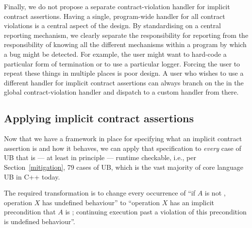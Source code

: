Finally, we do not propose a separate contract-violation handler for implicit contract assertions. Having a single, program-wide handler for all contract violations is a central aspect of the \cite{P2900R14} design. By standardising on a central reporting mechanism, we clearly separate the responsibility for reporting from the responsibility of knowing all the different mechanisms within a program by which a bug might be detected. For example, the user might want to hard-code a particular form of termination or to use a particular logger. Forcing the user to repeat these things in multiple places is poor design. A user who wishes to use a different handler for implicit contract assertions can always branch on the  in the global contract-violation handler and dispatch to a custom handler from there.

\subsection{Applying implicit contract assertions}
\label{applyicas}

Now that we have a framework in place for specifying what an implicit contract assertion is and how it behaves, we can apply that specification to \emph{every} case of UB  that is --- at least in principle --- runtime checkable, i.e., per Section~\ref{mitigation}, 79 cases of UB, which is the vast majority of core language UB in C++ today.

The required transformation is to change every occurrence of “if $A$ is not , operation $X$ has undefined behaviour'' to ``operation $X$ has an implicit precondition that $A$ is ; continuing execution past a violation of this precondition is undefined behaviour''.

